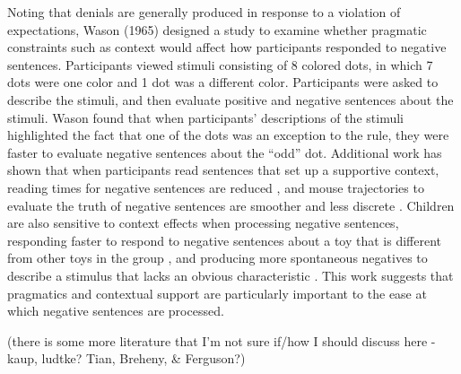 \documentclass[10pt,letterpaper]{article}
\begin{document}
Noting that denials are generally produced in response to a violation of expectations, Wason (1965) designed a study to examine whether pragmatic constraints such as context would affect how participants responded to negative sentences.  Participants viewed stimuli consisting of 8 colored dots, in which 7 dots were one color and 1 dot was a different color.  Participants were asked to describe the stimuli, and then evaluate positive and negative sentences about the stimuli.  Wason found that when participants' descriptions of the stimuli highlighted the fact that one of the dots was an exception to the rule, they were faster to evaluate negative sentences about the ``odd'' dot.  Additional work has shown that when participants read sentences that set up a supportive context, reading times for negative sentences are reduced \cite{glenberg1999, ludtke2006}, and mouse trajectories to evaluate the truth of negative sentences are smoother and less discrete \cite{dale2011}.  Children are also sensitive to context effects when processing negative sentences, responding faster to respond to negative sentences about a toy that is different from other toys in the group \cite{devilliers1975}, and producing more spontaneous negatives to describe a stimulus that lacks an obvious characteristic \cite{watson1979}.  This work suggests that pragmatics and contextual support are particularly important to the ease at which negative sentences are processed.   

(there is some more literature that I'm not sure if/how I should discuss here - kaup, ludtke?  Tian, Breheny, \& Ferguson?)
\end{document}
